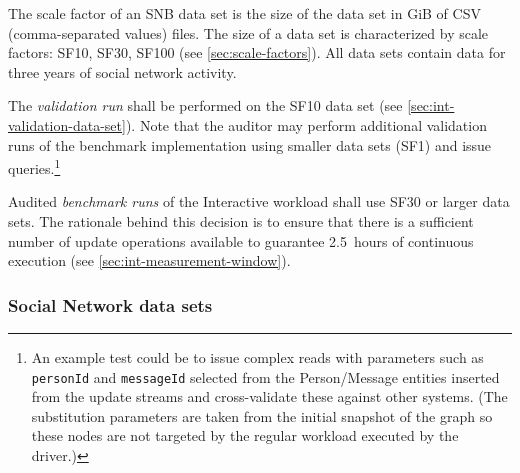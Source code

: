 The scale factor of an SNB data set is the size of the data set in GiB of CSV (comma-separated values) files.
The size of a data set is characterized by scale factors: SF10, SF30, SF100 \etc (see \autoref{sec:scale-factors}).
All data sets contain data for three years of social network activity.

The \emph{validation run} shall be performed on the SF10 data set (see \autoref{sec:int-validation-data-set}). Note that the auditor may perform additional validation runs of the benchmark implementation using smaller data sets (\eg SF1) and issue queries.\footnote{%
An example test could be to issue complex reads with parameters such as \texttt{personId} and \texttt{messageId} selected from the \textsf{Person}/\textsf{Message} entities inserted from the update streams and cross-validate these against other systems. (The substitution parameters are taken from the initial snapshot of the graph so these nodes are not targeted by the regular workload executed by the driver.)%
}

Audited \emph{benchmark runs} of the Interactive workload shall use SF30 or larger data sets. The rationale behind this decision is to ensure that there is a sufficient number of update operations available to guarantee 2.5~hours of continuous execution (see \autoref{sec:int-measurement-window}).


\subsubsection{Social Network data sets}
\label{sec:int-data-sets}

